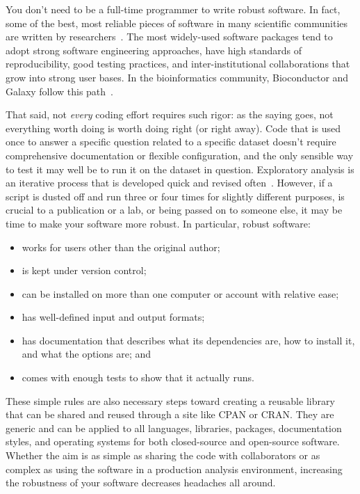 \documentclass[10pt,letterpaper]{article}
\begin{document}
You don't need to be a full-time programmer to write robust software. In fact,
some of the best, most reliable pieces of software in many scientific
communities are written by researchers~\cite{prabhu2011,sanders2008}. 
The most widely-used software packages tend to adopt strong software
engineering approaches, have high standards of reproducibility, good testing
practices, and inter-institutional collaborations that grow into strong user
bases. In the bioinformatics community, Bioconductor and Galaxy follow this
path~\cite{gentleman2004,afgan2016}.

That said, not \emph{every} coding effort requires such rigor:
as the saying goes, not everything worth doing is worth doing right (or right away).
Code that is used once to answer a specific question related to a specific dataset
doesn't require comprehensive documentation or flexible configuration,
and the only sensible way to test it may well be to run it on the dataset in
question. Exploratory analysis is an iterative process that is developed
quick and revised often~\cite{lawlor2015,sanders2008}. 
However, if a script is dusted off and run three or four
times for slightly different purposes,
is crucial to a publication or a lab,
or being passed on to someone else,
it may be time to make your software more robust.
In particular, robust software:

\begin{itemize}
\item
  works for users other than the original author;
\item
  is kept under version control;
\item
  can be installed on more than one computer or account with relative ease;
\item
  has well-defined input and output formats;
\item
  has documentation that describes what its dependencies are, how to
  install it, and what the options are; and
\item
  comes with enough tests to show that it actually runs.
\end{itemize}

These simple rules are also necessary steps toward creating a reusable
library that can be shared and reused through a site like CPAN or CRAN.  They are
generic and can be applied to all languages, libraries, packages,
documentation styles, and operating systems for both closed-source and
open-source software.  
Whether the aim is as simple as sharing the
code with collaborators or as complex as using the software in a
production analysis environment, increasing the robustness of your
software decreases headaches all around.
\end{document}
